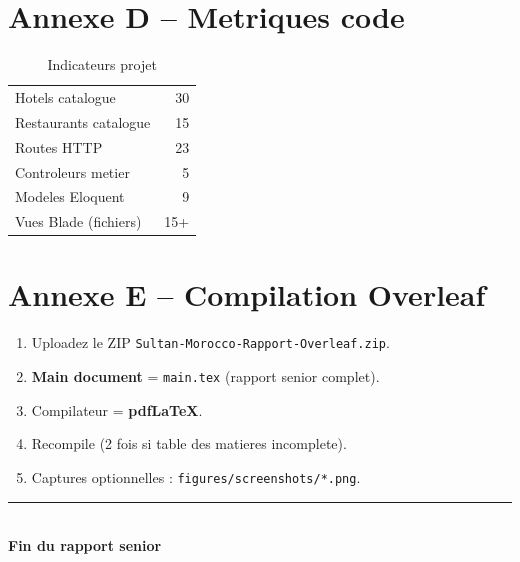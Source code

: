 \section*{Annexe D -- Metriques code}

\begin{table}[H]
\centering
\caption{Indicateurs projet}
\begin{tabular}{@{}lr@{}}
\toprule
Hotels catalogue & 30 \\
Restaurants catalogue & 15 \\
Routes HTTP & 23 \\
Controleurs metier & 5 \\
Modeles Eloquent & 9 \\
Vues Blade (fichiers) & 15+ \\
\bottomrule
\end{tabular}
\end{table}

\section*{Annexe E -- Compilation Overleaf}

\begin{enumerate}
  \item Uploadez le ZIP \texttt{Sultan-Morocco-Rapport-Overleaf.zip}.
  \item \textbf{Main document} = \texttt{main.tex} (rapport senior complet).
  \item Compilateur = \textbf{pdfLaTeX}.
  \item Recompile (2 fois si table des matieres incomplete).
  \item Captures optionnelles : \texttt{figures/screenshots/*.png}.
\end{enumerate}

\vfill
\begin{center}
\rule{0.55\textwidth}{0.6pt}\\[0.6em]
{\LARGE\bfseries\color{SultanTeal} Fin du rapport senior}\\[0.3em]
\reportversion
\end{center}
